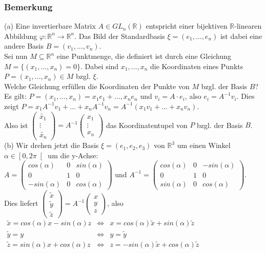 \documentclass[a4paper]{article}
\let\phi\varphi
\begin{document}
\subsubsection{Bemerkung}
(a) Eine invertierbare Matrix \(A\in GL_n(\mathbb{R})\) entspricht einer bijektiven \(\mathbb{R}\)-linearen Abbildung \(\phi:\mathbb{R}^n\rightarrow\mathbb{R}^n\). Das Bild der Standardbasis \(\xi=(e_1,\dots,e_n)\) ist dabei eine andere Basis \(B=(v_1,\dots,v_n)\).\\
Sei nun \(M\subseteq\mathbb{R}^n\) eine Punktmenge, die definiert ist durch eine Gleichung \(M=\{(x_1,\dots,x_n)=0\}\). Dabei sind \(x_1,\dots,x_n\) die Koordinaten eines Punkts \(P=(x_1,\dots,x_n)\in M\) bzgl. \(\xi\).\\
Welche Gleichung erfüllen die Koordinaten der Punkte von \(M\) bzgl. der Basis \(B\)?\\
Es gilt: \(P=(x_1,\dots,x_n)=x_1e_1+\dots,x_ne_n\) und \(v_i=A\cdot e_i\), also \(e_i=A^{-1}v_i\). Dies zeigt \(P=x_1A^{-1}v_1+\dots+x_nA^{-1}v_n=A^{-1}(x_1v_1+\dots+x_nv_n)\).\\
Also ist \(\begin{pmatrix}
\tilde{x_1}\\
\vdots\\
\tilde{x_n}
\end{pmatrix}=A^{-1}\begin{pmatrix}
x_1\\
\vdots\\
x_n
\end{pmatrix}\) das Koordinatentupel von \(P\) bzgl. der Basis \(B\).\\
(b) Wir drehen jetzt die Basis \(\xi=(e_1,e_2,e_3)\) von \(\mathbb{R}^3\) um einen Winkel \(\alpha\in\left[0,2\pi\right[\) um die y-Achse:\\
\(A=\begin{pmatrix}
cos(\alpha) & 0 & sin(\alpha)\\
0 & 1 & 0\\
-sin(\alpha) & 0 & cos(\alpha)
\end{pmatrix}\) und \(A^{-1}=\begin{pmatrix}
cos(\alpha) & 0 & -sin(\alpha)\\
0 & 1 & 0\\
sin(\alpha) & 0 & cos(\alpha)
\end{pmatrix}\).\\
Dies liefert \(\begin{pmatrix}
\tilde{x}\\
\tilde{y}\\
\tilde{z}
\end{pmatrix}=A^{-1}\begin{pmatrix}
x\\
y\\
z
\end{pmatrix}\), also\quad \(\begin{matrix}
\tilde{x}=cos(\alpha)x-sin(\alpha)z & \Leftrightarrow & x=cos(\alpha)\tilde{x}+sin(\alpha)\tilde{z}\\
\tilde{y}=y & \Leftrightarrow & y=\tilde{y}\\
\tilde{z}=sin(\alpha)x+cos(\alpha)z & \Leftrightarrow & z=-sin(\alpha)\tilde{x}+cos(\alpha)\tilde{z}
\end{matrix}\)\\
\end{document}
